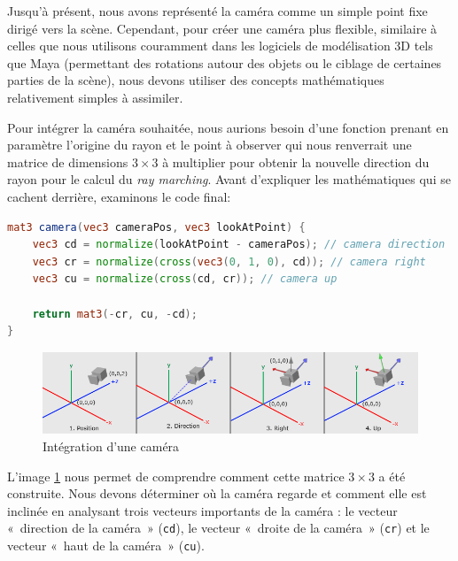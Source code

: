 Jusqu'à présent, nous avons représenté la caméra comme un simple point fixe dirigé vers la scène. Cependant, pour créer une caméra plus flexible, similaire à celles que nous utilisons couramment dans les logiciels de modélisation 3D tels que Maya (permettant des rotations autour des objets ou le ciblage de certaines parties de la scène), nous devons utiliser des concepts mathématiques relativement simples à assimiler.


Pour intégrer la caméra souhaitée, nous aurions besoin d'une fonction prenant en paramètre l'origine du rayon et le point à observer qui nous renverrait une matrice de dimensions $3\times3$ à multiplier pour obtenir la nouvelle direction du rayon pour le calcul du  \textit{ray marching}. Avant d'expliquer les mathématiques qui se cachent derrière, examinons le code final:

\begin{minipage}{\linewidth}
\begin{lstlisting}[language=GLSL, caption=Fonction \lstinline{camera()},captionpos=b,frame=single]
mat3 camera(vec3 cameraPos, vec3 lookAtPoint) {
	vec3 cd = normalize(lookAtPoint - cameraPos); // camera direction
	vec3 cr = normalize(cross(vec3(0, 1, 0), cd)); // camera right
	vec3 cu = normalize(cross(cd, cr)); // camera up
	
	return mat3(-cr, cu, -cd);
}
\end{lstlisting}
\end{minipage}

\begin{figure}[h]
    \begin{center}
    \includegraphics[width=0.75\linewidth]{images/shaders/camera00.png}
    \end{center}
    \caption{Intégration d'une caméra}
    \label{camera00}
\end{figure}

L'image \ref{camera00} nous permet de comprendre comment cette matrice $3\times3$ a été construite. Nous devons déterminer où la caméra regarde et comment elle est inclinée en analysant trois vecteurs importants de la caméra : le vecteur «~direction de la caméra~» (\lstinline{cd}), le vecteur «~droite de la caméra~» (\lstinline{cr}) et le vecteur «~haut de la caméra~» (\lstinline{cu}).

